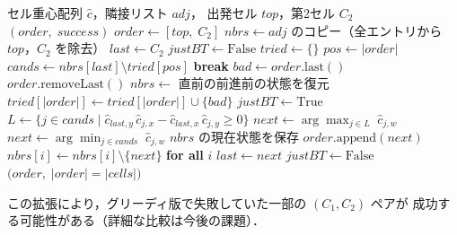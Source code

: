 \documentclass[12pt,a4paper]{article}
\theoremstyle{definition}
\newcommand{\algorithmicbreak}{\textbf{break}}
\newcommand{\Break}{\State\algorithmicbreak}
\begin{document}
\begin{algorithm}[h]
\caption{peeling1back（1段バックトラック版，選択ループ部分）}
\label{alg:1back}
\begin{algorithmic}[1]
\Require セル重心配列 $\hat{c}$，隣接リスト $\mathit{adj}$，
         出発セル $\mathit{top}$，第2セル $C_2$
\Ensure  $(\mathit{order},\; \mathit{success})$
\State $\mathit{order} \gets [\mathit{top},\; C_2]$
\State $\mathit{nbrs} \gets \mathit{adj}$ のコピー（全エントリから $\mathit{top}$，$C_2$ を除去）
\State $\mathit{last} \gets C_2$
\State $\mathit{justBT} \gets \mathrm{False}$
\State $\mathit{tried} \gets \{\}$
  \State $\mathit{pos} \gets |\mathit{order}|$
  \State $\mathit{cands} \gets \mathit{nbrs}[\mathit{last}]
           \setminus \mathit{tried}[\mathit{pos}]$
      \Break
    \EndIf
    \State $\mathit{bad} \gets \mathit{order}.\mathrm{last}()$
    \State $\mathit{order}.\mathrm{removeLast}()$
    \State $\mathit{nbrs} \gets$ 直前の前進前の状態を復元
    \State $\mathit{tried}[|\mathit{order}|] \gets
             \mathit{tried}[|\mathit{order}|] \cup \{\mathit{bad}\}$
    \State $\mathit{justBT} \gets \mathrm{True}$
  \Else
    \State $L \gets \bigl\{j \in \mathit{cands} \mid
               \hat{c}_{\mathit{last},y}\,\hat{c}_{j,x}
               - \hat{c}_{\mathit{last},x}\,\hat{c}_{j,y} \geq 0\bigr\}$
      \State $\mathit{next} \gets \arg\max_{j \in L}\; \hat{c}_{j,w}$
    \Else
      \State $\mathit{next} \gets \arg\min_{j \in \mathit{cands}}\; \hat{c}_{j,w}$
    \EndIf
    \State $\mathit{nbrs}$ の現在状態を保存
    \State $\mathit{order}.\mathrm{append}(\mathit{next})$
    \State $\mathit{nbrs}[i] \gets \mathit{nbrs}[i] \setminus \{\mathit{next}\}$
      \hspace{2em}\textbf{for all} $i$
    \State $\mathit{last} \gets \mathit{next}$
    \State $\mathit{justBT} \gets \mathrm{False}$
  \EndIf
\EndWhile
\State \Return $\bigl(\mathit{order},\; |\mathit{order}| = |\mathit{cells}|\bigr)$
\end{algorithmic}
\end{algorithm}

この拡張により，グリーディ版で失敗していた一部の $(C_1, C_2)$ ペアが
成功する可能性がある（詳細な比較は今後の課題）．
\end{document}
